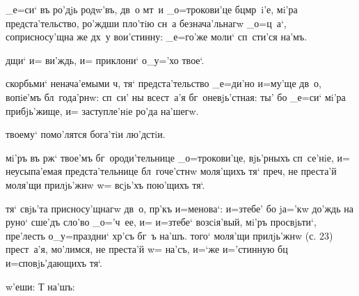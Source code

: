  _е=си` въ ро'дjь родw'въ, дв~о мт~и 
_о=трокови'це бц мр~i'е, мi'ра предста'тельство, 
ро'ждши пло'тiю сн~а безнача'льнагw _о=ц~а`, 
соприсносу'щна же дх~у вои'стинну: _е=го'же моли` 
сп~сти'ся на'мъ.

  дщи` и= ви'ждь, и= приклони` о_у='хо 
твое`.

 скорбьми` ненача'емыми ч, тя` 
предста'тельство _е=ди'но и=му'ще дв~о, вопiе'мъ 
бл~года'рнw: сп~си' ны всест~а'я бг~оневjь'стная: ты' бо 
_е=си` мi'ра прибjь'жище, и= заступле'нiе ро'да на'шегw.

  твоему` помо'лятся бога'тiи лю'дстiи.

 мi'ръ въ рж` твое'мъ 
бг~ороди'тельнице _о=трокови'це, вjь'рныхъ сп~се'нiе, и= 
неусыпа'емая предста'тельнице бл~гоче'стнw моля'щихъ тя` 
преч, не преста'й моля'щи прилjь'жнw w= всjь'хъ 
пою'щихъ тя`.


 тя` свjь'та присносу'щнагw дв~о, пр'къ 
и=менова`: и=з\ъ тебе' бо jа='кw до'ждь на руно` сше'дъ 
сло'во _о='ч~ее, и= и=з\ъ тебе` возсiя'вый, мi'ръ 
просвjьти`, пре'лесть о_у=праздни` хр'съ бг~ъ на'шъ. 
того` моля'щи прилjь'жнw (с. 23) прест~а'я, мо'лимся, не 
преста'й w= на'съ, и=`же и='стинную бц 
и=сповjь'дающихъ тя`.

  w'еши: Т   
на'шъ: 
